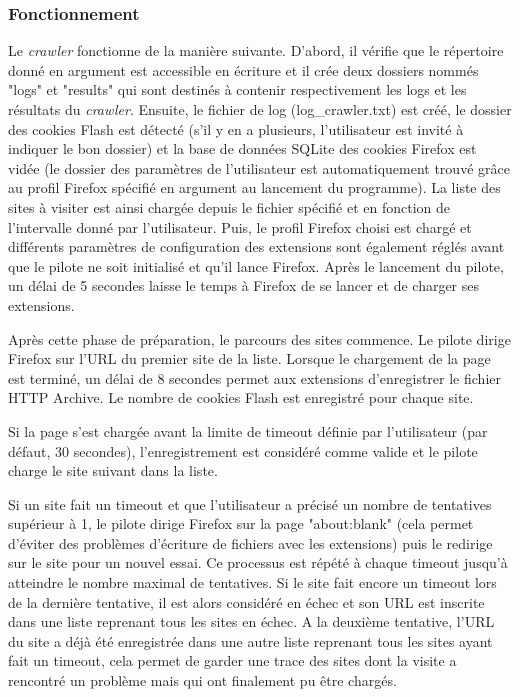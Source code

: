\subsubsection{Fonctionnement}
Le \textit{crawler} fonctionne de la manière suivante. D'abord, il vérifie que le répertoire donné en argument est accessible en écriture et il crée deux dossiers nommés "logs" et "results" qui sont destinés à contenir respectivement les logs et les résultats du \textit{crawler}. Ensuite, le fichier de log (log\_crawler.txt) est créé, le dossier des cookies Flash est détecté (s'il y en a plusieurs, l'utilisateur est invité à indiquer le bon dossier) et la base de données SQLite des cookies Firefox est vidée (le dossier des paramètres de l'utilisateur est automatiquement trouvé grâce au profil Firefox spécifié en argument au lancement du programme). La liste des sites à visiter est ainsi chargée depuis le fichier spécifié et en fonction de l'intervalle donné par l'utilisateur. Puis, le profil Firefox choisi est chargé et différents paramètres de configuration des extensions sont également réglés avant que le pilote ne soit initialisé et qu'il lance Firefox. Après le lancement du pilote, un délai de 5 secondes laisse le temps à Firefox de se lancer et de charger ses extensions.
\newline

Après cette phase de préparation, le parcours des sites commence. Le pilote dirige Firefox sur l'URL du premier site de la liste. Lorsque le chargement de la page est terminé, un délai de 8 secondes permet aux extensions d'enregistrer le fichier HTTP Archive. Le nombre de cookies Flash est enregistré pour chaque site.

Si la page s'est chargée avant la limite de timeout définie par l'utilisateur (par défaut, 30 secondes), l'enregistrement est considéré comme valide et le pilote charge le site suivant dans la liste.

Si un site fait un timeout et que l'utilisateur a précisé un nombre de tentatives supérieur à 1, le pilote dirige Firefox sur la page "about:blank" (cela permet d'éviter des problèmes d'écriture de fichiers avec les extensions) puis le redirige sur le site pour un nouvel essai. Ce processus est répété à chaque timeout jusqu'à atteindre le nombre maximal de tentatives. Si le site fait encore un timeout lors de la dernière tentative, il est alors considéré en échec et son URL est inscrite dans une liste reprenant tous les sites en échec. A la deuxième tentative, l'URL du site a déjà été enregistrée dans une autre liste reprenant tous les sites ayant fait un timeout, cela permet de garder une trace des sites dont la visite a rencontré un problème mais qui ont finalement pu être chargés. 

